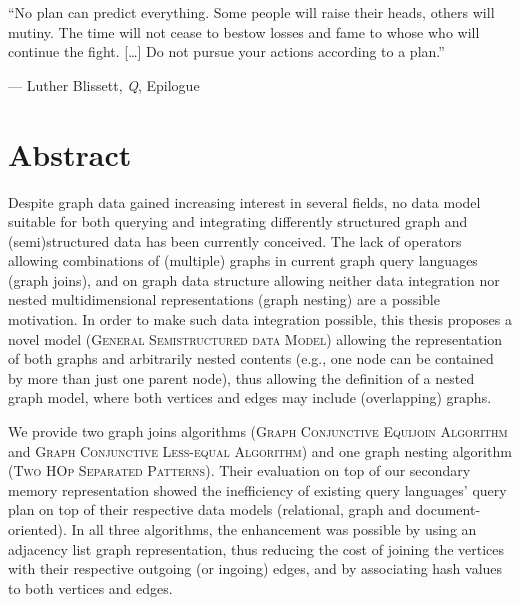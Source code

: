 \epigraph{``No plan can predict everything. Some people will raise their heads, others will mutiny. The time will not cease to bestow losses and fame to whose who will continue the fight. [\dots] Do not pursue your actions according to a plan.''}{--- Luther Blissett, \textit{Q}, Epilogue}

\chapter*{Abstract}

Despite graph data gained increasing interest in several fields, no data model suitable for both querying and integrating differently structured graph and (semi)structured data has been currently conceived. The lack of operators allowing combinations of (multiple) graphs in current graph query languages (graph joins), and on graph data structure allowing neither data integration nor nested multidimensional representations (graph nesting) are a possible motivation. In order to make such data integration possible, this thesis proposes a novel model (\textsc{General Semistructured data Model}) allowing the representation of both graphs and arbitrarily nested contents (e.g., one node can be contained by more than just
one parent node), thus allowing the definition of a nested graph model, where both vertices and edges may include (overlapping) graphs.

We provide two graph joins algorithms (\textsc{Graph Conjunctive Equijoin Algorithm} and \textsc{Graph Conjunctive Less-equal Algorithm}) and one graph nesting algorithm (\textsc{Two HOp Separated Patterns}). Their evaluation on top of our secondary memory representation showed the inefficiency of existing query languages’ query plan on top of their respective data models (relational, graph and document-oriented). In all three algorithms, the enhancement was possible by using an adjacency list graph representation, thus reducing the cost of joining the vertices with their respective outgoing (or ingoing) edges, and by associating hash values to both vertices and edges. 





